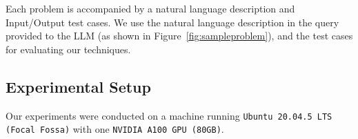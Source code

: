 Each problem is accompanied by a natural language description and Input/Output test cases. We use the natural language description in the query provided to the LLM (as shown in Figure~\ref{fig:sampleproblem}), and the test cases for evaluating our techniques.






\subsection{Experimental Setup}\label{sec:setup}

Our experiments were conducted on a machine running \texttt{Ubuntu 20.04.5 LTS (Focal Fossa)} with one \texttt{NVIDIA A100 GPU (80GB)}.
 
%
%

